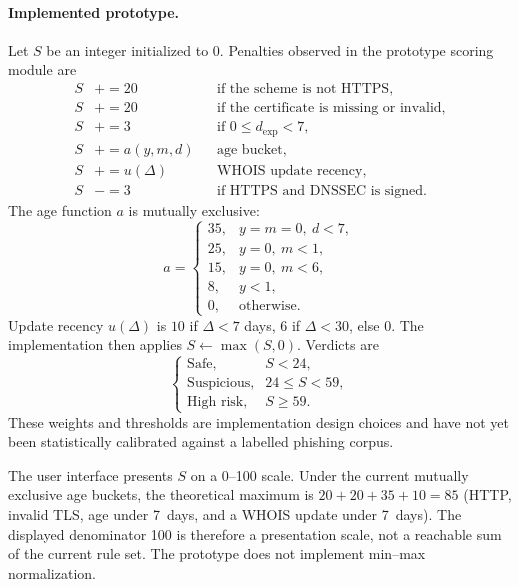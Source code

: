 \documentclass[conference]{IEEEtran}
\begin{document}
\paragraph{Implemented prototype.}
Let $S$ be an integer initialized to $0$. Penalties observed in the prototype scoring module are
\begin{align}
S &\mathrel{+}= 20 && \text{if the scheme is not HTTPS,} \nonumber\\
S &\mathrel{+}= 20 && \text{if the certificate is missing or invalid,} \nonumber\\
S &\mathrel{+}= 3 && \text{if } 0 \le d_{\mathrm{exp}} < 7, \nonumber\\
S &\mathrel{+}= a(y,m,d) && \text{age bucket,} \nonumber\\
S &\mathrel{+}= u(\Delta) && \text{WHOIS update recency,} \nonumber\\
S &\mathrel{-}= 3 && \text{if HTTPS and DNSSEC is signed.} \nonumber
\end{align}
The age function $a$ is mutually exclusive:
\begin{equation}
a=
\begin{cases}
35, & y=m=0,\ d<7,\\
25, & y=0,\ m<1,\\
15, & y=0,\ m<6,\\
8, & y<1,\\
0, & \text{otherwise.}
\end{cases}
\label{eq:age}
\end{equation}
Update recency $u(\Delta)$ is $10$ if $\Delta<7$ days, $6$ if $\Delta<30$, else $0$. The implementation then applies $S \leftarrow \max(S,0)$. Verdicts are
\begin{equation}
\begin{cases}
\text{Safe,} & S<24,\\
\text{Suspicious,} & 24\le S<59,\\
\text{High risk,} & S\ge 59.
\end{cases}
\label{eq:verdict}
\end{equation}
These weights and thresholds are implementation design choices and have not yet been statistically calibrated against a labelled phishing corpus.

The user interface presents $S$ on a 0--100 scale. Under the current mutually exclusive age buckets, the theoretical maximum is $20+20+35+10=85$ (HTTP, invalid TLS, age under 7~days, and a WHOIS update under 7~days). The displayed denominator 100 is therefore a presentation scale, not a reachable sum of the current rule set. The prototype does not implement min--max normalization.
\end{document}
